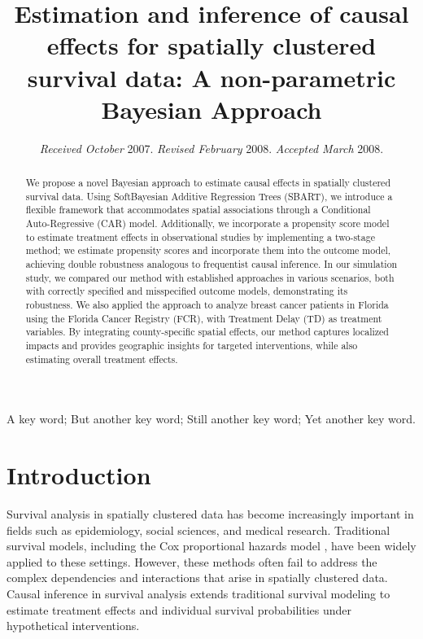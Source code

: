 \documentclass[useAMS,referee]{biom}
\title{
Estimation and inference of causal effects for spatially clustered survival data: A non-parametric Bayesian Approach}
\begin{document}
\date{{\it Received October} 2007. {\it Revised February} 2008.  {\it
Accepted March} 2008.}



\label{firstpage}


\begin{abstract}
We propose a novel Bayesian approach to estimate causal effects in spatially clustered survival data. Using SoftBayesian Additive Regression Trees (SBART), we introduce a flexible framework that accommodates spatial associations through a Conditional Auto-Regressive (CAR) model. Additionally, we incorporate a propensity score model to estimate treatment effects in observational studies by implementing a two-stage method; we estimate propensity scores and incorporate them into the outcome model, achieving double robustness analogous to frequentist causal inference. In our simulation study, we compared our method with established approaches in various scenarios, both with correctly specified and misspecified outcome models, demonstrating its robustness.  We also applied the approach to analyze breast cancer patients in Florida using the Florida Cancer Registry (FCR), with Treatment Delay (TD) as treatment variables. By integrating county-specific spatial effects, our method captures localized impacts and provides geographic insights for targeted interventions, while also estimating overall treatment effects. 
\end{abstract}

\begin{keywords}
A key word; But another key word; Still another key word; Yet another key word.
\end{keywords}


\maketitle



\section{Introduction}
Survival analysis in spatially clustered data has become increasingly important in fields such as epidemiology, social sciences, and medical research. Traditional survival models, including the Cox proportional hazards model \parencite{cox1972regression}, have been widely applied to these settings. However, these methods often fail to address the complex dependencies and interactions that arise in spatially clustered data. Causal inference in survival analysis extends traditional survival modeling to estimate treatment effects and individual survival probabilities under hypothetical interventions. 
\end{document}

